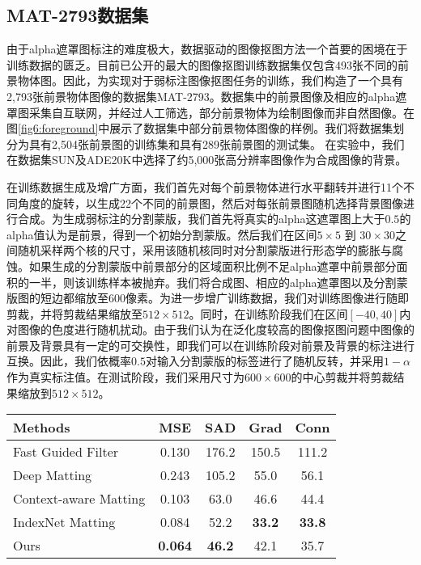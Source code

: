 \subsection{MAT-2793数据集}
\label{sec6:data}
由于alpha遮罩图标注的难度极大，数据驱动的图像抠图方法一个首要的困境在于训练数据的匮乏。目前已公开的最大的图像抠图训练数据集\cite{xu2017deep}仅包含493张不同的前景物体图。因此，为实现对于弱标注图像抠图任务的训练，我们构造了一个具有2,793张前景物体图像的数据集MAT-2793。数据集中的前景图像及相应的alpha遮罩图采集自互联网，并经过人工筛选，部分前景物体为绘制图像而非自然图像。在图\ref{fig6:foreground}中展示了数据集中部分前景物体图像的样例。我们将数据集划分为具有2,504张前景图的训练集和具有289张前景图的测试集。
在实验中，我们在数据集SUN\cite{xiao2010sun}及ADE20K\cite{zhou2017scene}中选择了约5,000张高分辨率图像作为合成图像的背景。

在训练数据生成及增广方面，我们首先对每个前景物体进行水平翻转并进行11个不同角度的旋转，以生成22个不同的前景图，然后对每张前景图随机选择背景图像进行合成。为生成弱标注的分割蒙版，我们首先将真实的alpha这遮罩图上大于$0.5$的alpha值认为是前景，得到一个初始分割蒙版。然后我们在区间$5\times5$ 到 $30\times30$之间随机采样两个核的尺寸，采用该随机核同时对分割蒙版进行形态学的膨胀与腐蚀。如果生成的分割蒙版中前景部分的区域面积比例不足alpha遮罩中前景部分面积的一半，则该训练样本被抛弃。我们将合成图、相应的alpha遮罩图以及分割蒙版图的短边都缩放至600像素。为进一步增广训练数据，我们对训练图像进行随即剪裁，并将剪裁结果缩放至$512\times512$。同时，在训练阶段我们在区间$ [-40, 40] $内对图像的色度进行随机扰动。由于我们认为在泛化度较高的图像抠图问题中图像的前景及背景具有一定的可交换性，即我们可以在训练阶段对前景及背景的标注进行互换。因此，我们依概率$0.5$对输入分割蒙版的标签进行了随机反转，并采用$1-\alpha$作为真实标注值。在测试阶段，我们采用尺寸为$600\times600$的中心剪裁并将剪裁结果缩放到$512\times512$。

\begin{table}[t]
	\setlength{\tabcolsep}{16pt}
	\centering
	\begin{tabular}{lcccc}  
		\toprule
		Methods & MSE & SAD & Grad &Conn\\
		\midrule
		Fast Guided Filter \cite{he2015fast} &  0.130 & 176.2  & 150.5  & 111.2 \\
		Deep Matting \cite{xu2017deep} & 0.243 & 105.2 & 55.0 & 56.1\\
		Context-aware Matting \cite{hou2019context}  & 0.103  & 63.0  & 46.6  & 44.4 \\
		IndexNet Matting \cite{lu2019indices}  & 0.084 & 52.2 & \textbf{33.2} & \textbf{33.8}\\
		Ours & \textbf{0.064} & \textbf{46.2} & {42.1} & {35.7}\\        
		\bottomrule
	\end{tabular}
	\label{tab6:adobe}
\end{table}

